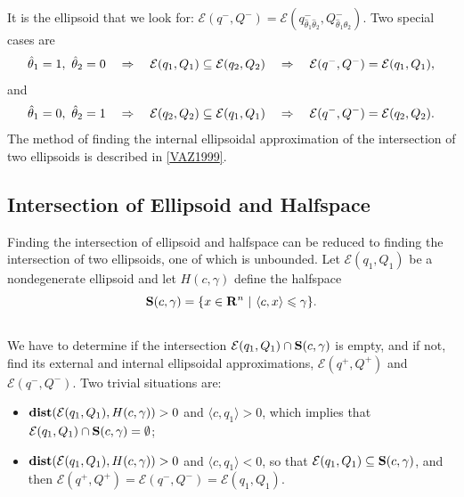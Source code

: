 \documentclass[letterpaper,10pt,english]{sphinxmanual}
\begin{document}
It is the ellipsoid that we look for:
${\mathcal E}(q^-,Q^-)={\mathcal E}(q^-_{\hat{\theta}_1\hat{\theta}_2},Q^-_{\hat{\theta}_1\hat{\theta}_2})$.
Two special cases are
\begin{gather}
\begin{split}\hat{\theta}_1=1, ~ \hat{\theta}_2=0 ~~~ \Rightarrow ~~~
{\mathcal E}(q_1,Q_1)\subseteq{\mathcal E}(q_2,Q_2) ~~~ \Rightarrow ~~~
{\mathcal E}(q^-,Q^-)={\mathcal E}(q_1,Q_1),\end{split}\notag
\end{gather}
and
\begin{gather}
\begin{split}\hat{\theta}_1=0, ~ \hat{\theta}_2=1 ~~~ \Rightarrow ~~~
{\mathcal E}(q_2,Q_2)\subseteq{\mathcal E}(q_1,Q_1) ~~~ \Rightarrow ~~~
{\mathcal E}(q^-,Q^-)={\mathcal E}(q_2,Q_2).\end{split}\notag
\end{gather}
The method of finding the internal ellipsoidal approximation of the
intersection of two ellipsoids is described in {\hyperref[main_source:vaz1999]{{[}VAZ1999{]}}}.


\subsection{Intersection of Ellipsoid and Halfspace}
\label{main_source:intersection-of-ellipsoid-and-halfspace}
Finding the intersection of ellipsoid and halfspace can be reduced to
finding the intersection of two ellipsoids, one of which is unbounded.
Let ${\mathcal E}(q_1,Q_1)$ be a nondegenerate ellipsoid and let
$H(c,\gamma)$ define the halfspace
\begin{gather}
\begin{split}{\bf S}(c,\gamma) = \{x\in{\bf R}^n ~|~ \langle c,x\rangle\leqslant\gamma\}.\end{split}\notag\\\begin{split}\end{split}\notag
\end{gather}
We have to determine if the intersection
${\mathcal E}(q_1,Q_1)\cap{\bf S}(c,\gamma)$ is empty, and if not,
find its external and internal ellipsoidal approximations,
${\mathcal E}(q^+,Q^+)$ and ${\mathcal E}(q^-,Q^-)$. Two
trivial situations are:
\begin{itemize}
\item {} 
${\bf dist}({\mathcal E}(q_1,Q_1),H(c,\gamma))>0$ and
$\langle c, q_1\rangle>0$, which implies that
${\mathcal E}(q_1,Q_1)\cap{\bf S}(c,\gamma)=\emptyset$;

\item {} 
${\bf dist}({\mathcal E}(q_1,Q_1),H(c,\gamma))>0$ and
$\langle c, q_1\rangle<0$, so that
${\mathcal E}(q_1,Q_1)\subseteq{\bf S}(c,\gamma)$, and then
${\mathcal E}(q^+,Q^+)={\mathcal E}(q^-,Q^-)={\mathcal E}(q_1,Q_1)$.

\end{itemize}
\end{document}
